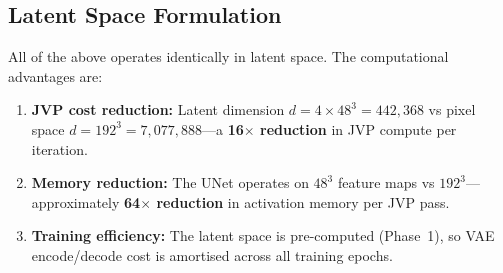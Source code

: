 \subsection{Latent Space Formulation}

All of the above operates identically in latent space.  The computational
advantages are:
\begin{enumerate}[nosep]
  \item \textbf{JVP cost reduction:} Latent dimension
    $d = 4\times 48^3 = 442{,}368$ vs pixel space
    $d = 192^3 = 7{,}077{,}888$---a \textbf{16$\times$ reduction} in JVP
    compute per iteration.
  \item \textbf{Memory reduction:} The UNet operates on $48^3$ feature maps
    vs $192^3$---approximately \textbf{64$\times$ reduction} in activation
    memory per JVP pass.
  \item \textbf{Training efficiency:} The latent space is pre-computed
    (Phase~1), so VAE encode/decode cost is amortised across all training
    epochs.
\end{enumerate}